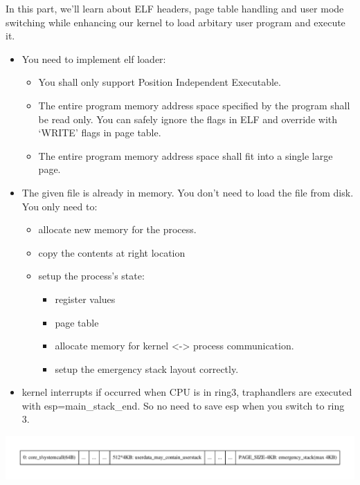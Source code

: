 \documentclass[]{book}
\begin{document}
In this part, we'll learn about ELF headers, page table handling and
user mode switching while enhancing our kernel to load arbitary user
program and execute it.

\begin{itemize}
\itemsep1pt\parskip0pt
\item
  You need to implement elf loader:

  \begin{itemize}
  \itemsep1pt\parskip0pt
  \item
    You shall only support Position Independent Executable.
  \item
    The entire program memory address space specified by the program
    shall be read only. You can safely ignore the flags in ELF and
    override with `WRITE' flags in page table.
  \item
    The entire program memory address space shall fit into a single
    large page.
  \end{itemize}
\item
  The given file is already in memory. You don't need to load the file
  from disk. You only need to:

  \begin{itemize}
  \itemsep1pt\parskip0pt
  \item
    allocate new memory for the process.
  \item
    copy the contents at right location
  \item
    setup the process's state:

    \begin{itemize}
    \itemsep1pt\parskip0pt
    \item
      register values
    \item
      page table
    \item
      allocate memory for kernel \textless{}-\textgreater{} process
      communication.
    \item
      setup the emergency stack layout correctly.
    \end{itemize}
  \end{itemize}
\item
  kernel interrupts if occurred when CPU is in ring3, traphandlers are
  executed with esp=main\_stack\_end. So no need to save esp when you
  switch to ring 3.
\end{itemize}

\includegraphics{graphviz-images/35fb0c92f47d3e29205a5e8b6f7f0643059d4b17.pdf}
\end{document}
